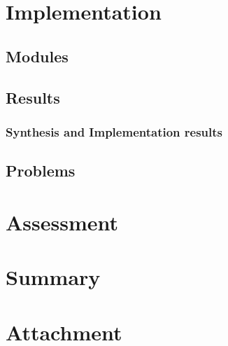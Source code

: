 \documentclass[12pt]{article}
\begin{document}
\newpage
\section{Implementation}
	\subsection{Modules}
	\subsection{Results}
		\subsubsection{Synthesis and Implementation results}
	\subsection{Problems}

\newpage
\section{Assessment}

\newpage
\section{Summary}

\newpage
\section{Attachment}
\end{document}
